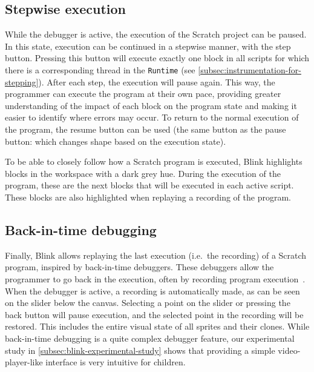 \documentclass[../main]{subfiles}
\begin{document}
\subsection{Stepwise execution}\label{subsec:stepwise-execution}
While the debugger is active, the execution of the Scratch project can be paused.
In this state, execution can be continued in a stepwise manner, with the step button.
Pressing this button will execute exactly one block in all scripts for which there is a corresponding thread in the \texttt{Runtime} (see \cref{subsec:instrumentation-for-stepping}).
After each step, the execution will pause again.
This way, the programmer can execute the program at their own pace, providing greater understanding of the impact of each block on the program state and making it easier to identify where errors may occur.
To return to the normal execution of the program, the resume button can be used (the same button as the pause button: which changes shape based on the execution state).

To be able to closely follow how a Scratch program is executed, Blink highlights blocks in the workspace with a dark grey hue.
During the execution of the program, these are the next blocks that will be executed in each active script.
These blocks are also highlighted when replaying a recording of the program.

\subsection{Back-in-time debugging}\label{subsec:back-in-time-debugging}
Finally, Blink allows replaying the last execution (i.e.\ the recording) of a Scratch program, inspired by back-in-time debuggers.
These debuggers allow the programmer to go back in the execution, often by recording program execution~\autocite{barrTardisAffordableTimetravel2014,barrTimetravelDebuggingJavaScript2016,czaplickiAsynchronousFunctionalReactive2013,balzerEXDAMSExtendableDebugging1969,ungarDebuggingExperienceImmediacy1997,chenReversibleDebuggingUsing2001,crescenziReversibleExecutionVisualization2000}.
When the debugger is active, a recording is automatically made, as can be seen on the slider below the canvas.
Selecting a point on the slider or pressing the back button will pause execution, and the selected point in the recording will be restored.
This includes the entire visual state of all sprites and their clones.
While back-in-time debugging is a quite complex debugger feature, our experimental study in \cref{subsec:blink-experimental-study} shows that providing a simple video-player-like interface is very intuitive for children.
\end{document}
